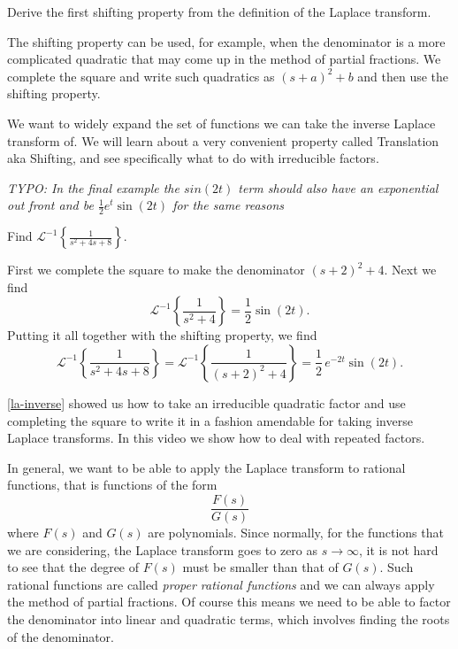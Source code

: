 \begin{exercise}
Derive the first shifting property
from the definition of the Laplace transform.
\end{exercise}

The shifting property can be used, for example, when the denominator is a
more complicated quadratic that may come up in the method of partial
fractions.  We complete the square and write such quadratics as ${(s+a)}^2+b$
and then use the shifting property.

\begin{video}
	We want to widely expand the set of functions we can take the inverse Laplace transform of. We will learn about a very convenient property called Translation aka Shifting, and see specifically what to do with irreducible factors. 

	\emph{TYPO: In the final example the $sin(2t)$ term should also have an exponential out front and be $\frac{1}{2}e^t\sin(2t)$ for the same reasons}
\end{video}

\begin{example}
Find
${\mathcal{L}}^{-1} \left\{ \frac{1}{s^2+4s+8} \right\}$.

First we complete the square to make the denominator ${(s+2)}^2+4$.  
Next we find
\begin{equation*}
{\mathcal{L}}^{-1} \left\{ \frac{1}{s^2+4} \right\}
=
\frac{1}{2} \sin (2t) .
\end{equation*}
Putting it all together with the shifting property, we find
\begin{equation*}
{\mathcal{L}}^{-1} \left\{ \frac{1}{s^2+4s+8} \right\} = 
{\mathcal{L}}^{-1} \left\{ \frac{1}{{(s+2)}^2+4} \right\}
=
\frac{1}{2}\,e^{-2t} \sin (2t) .
\end{equation*}
\end{example}

\begin{video}
	\ref{la-inverse} showed us how to take an irreducible quadratic factor and use completing the square to write it in a fashion amendable for taking inverse Laplace transforms. In this video we show how to deal with repeated factors. 
\end{video}

In general, we want to be able to apply the Laplace transform to
rational functions, that is functions of the form
\begin{equation*}
\frac{F(s)}{G(s)}
\end{equation*}
where $F(s)$ and $G(s)$ are polynomials.  Since normally, for the functions
that we are considering, the Laplace transform goes
to zero as $s \to \infty$, it is not hard to see that the degree of $F(s)$
must be smaller than that of $G(s)$.  Such rational functions
are called \emph{proper rational functions}
and we can always apply the method of partial fractions.  Of
course this means we need to be able to factor the denominator into
linear and quadratic terms, which involves finding the roots of the
denominator.

